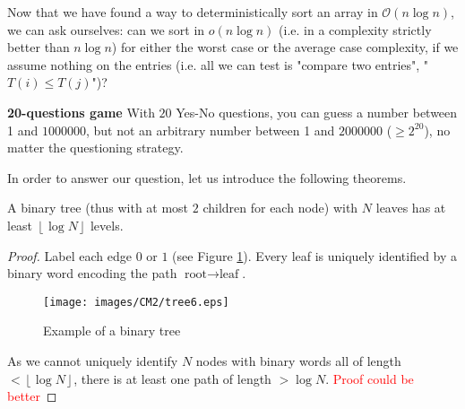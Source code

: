 Now that we have found a way to deterministically sort an array in $\mathcal{O}(n\log n)$, we can ask ourselves: can we sort in $o(n \log n)$ (i.e. in a complexity strictly better than $n \log n$) for either the worst case or the average case complexity, if we assume nothing on the entries (i.e. all we can test is "compare two entries", "$T(i) \leq T(j)$")?\\

\begin{example}
\begin{leftbar}
\textbf{20-questions game} With $20$ Yes-No questions, you can guess a number between 1 and $1000000$, but not an arbitrary number between 1 and $2000000$ ($\geq 2^{20}$), no matter the questioning strategy.
\end{leftbar}
\end{example}

In order to answer our question, let us introduce the following theorems.\\

\begin{theorem}
A binary tree (thus with at most $2$ children for each node) with $N$ leaves has at least $\left\lfloor \log N \right\rfloor$ levels.
\end{theorem}
\begin{proof}
Label each edge $0$ or $1$ (see Figure \ref{tree6}). Every leaf is uniquely identified by a binary word encoding the path $\text{root} \rightarrow \text{leaf}$.\\
\begin{figure}[htbp]
\centering
\texttt{[image: images/CM2/tree6.eps]}
\caption{Example of a binary tree}
\label{tree6}
\end{figure}
As we cannot uniquely identify $N$ nodes with binary words all of length $< \left\lfloor \log N \right\rfloor$, there is at least one path of length $> \log N$.
\textcolor{red}{Proof could be better}
\end{proof}

